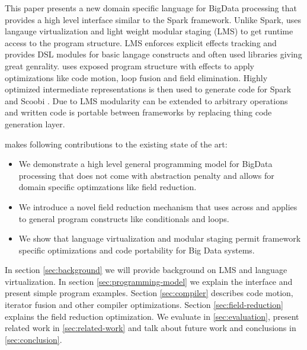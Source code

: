 
This paper presents a new domain specific language \tool for BigData processing that provides a high level interface similar to the Spark framework. Unlike Spark, \tool uses langauge virtualization  and light weight modular staging (LMS) to get runtime access to the program structure. LMS enforces explicit effects tracking and provides DSL modules for basic langage constructs and often used libraries giving \tool great genrality. \tool uses exposed program structure with effects to apply optimizations like code motion, loop fusion and field elimination. Highly optimized intermediate representations is then used to generate code for Spark and Scoobi . Due to LMS modularity \tool can be extended to arbitrary operations and written code is portable between frameworks by replacing thing code generation layer. 
 
% 

\tool makes following contributions to the existing state of the art:    
\begin{itemize}
  \item We demonstrate a high level general programming model for BigData processing that does not come with abstraction penalty and allows for domain specific optimzations like field reduction. 
  \item We introduce a novel field reduction mechanism that uses  across  and applies to general program constructs like conditionals and loops.
  \item We show that language virtualization and modular staging permit framework specific optimizations and code portability for Big Data systems.  
\end{itemize} 

In section \ref{sec:background} we will provide background on LMS and language virtualization. In section \ref{sec:programming-model} we explain the interface and present simple program examples. Section \ref{sec:compiler} describes code motion, iterator fusion and other compiler optimizations. Section \ref{sec:field-reduction} explains the field reduction optimization. We evaluate \tool in \ref{sec:evaluation}, present related work in \ref{sec:related-work} and talk about future work and conclusions in \ref{sec:conclusion}.